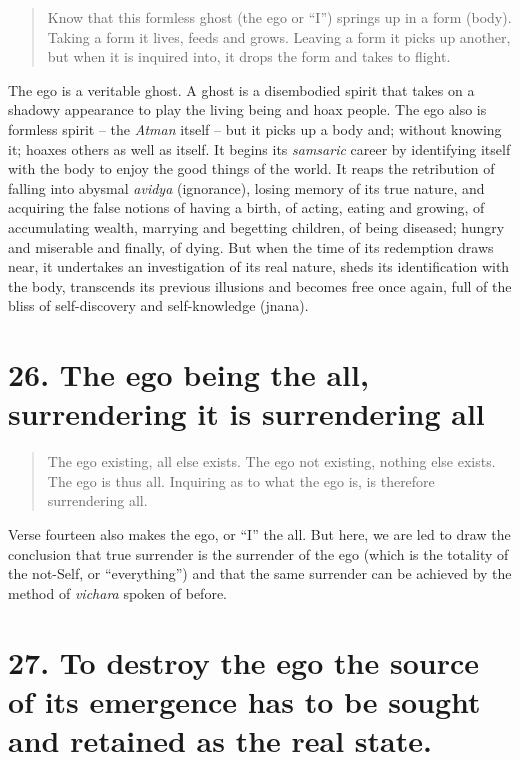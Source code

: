 \documentclass[12pt]{report}
\begin{document}
\begin{quote}
  Know that this formless ghost (the ego or ``I'') springs up in a form
  (body). Taking a form it lives, feeds and grows. Leaving a form it
  picks up another, but when it is inquired into, it drops the form and
  takes to flight.
\end{quote}

The ego is a veritable ghost. A ghost is a disembodied spirit that
takes on a shadowy appearance to play the living being and hoax
people. The ego also is formless spirit -- the \emph{Atman} itself --
but it picks up a body and; without knowing it; hoaxes others as well
as itself. It begins its \emph{samsaric} career by identifying itself
with the body to enjoy the good things of the world. It reaps the
retribution of falling into abysmal \emph{avidya} (ignorance), losing
memory of its true nature, and acquiring the false notions of having a
birth, of acting, eating and growing, of accumulating wealth, marrying
and begetting children, of being diseased; hungry and miserable and
finally, of dying. But when the time of its redemption draws near, it
undertakes an investigation of its real nature, sheds its
identification with the body, transcends its previous illusions and
becomes free once again, full of the bliss of self-discovery and
self-knowledge (jnana). 


\section{26. The ego being the all, surrendering it is surrendering all}

\begin{quote}
  The ego existing, all else exists. The ego not existing, nothing
  else exists. The ego is thus all. Inquiring as to what the ego is,
  is therefore surrendering all.
\end{quote}

Verse fourteen also makes the ego, or ``I'' the all. But here, we are
led to draw the conclusion that true surrender is the surrender of the
ego (which is the totality of the not-Self, or ``everything'') and
that the same surrender can be achieved by the method of
\emph{vichara} spoken of before.


\section{27. To destroy the ego the source of its emergence has to be sought and retained as the real state.}
\end{document}
